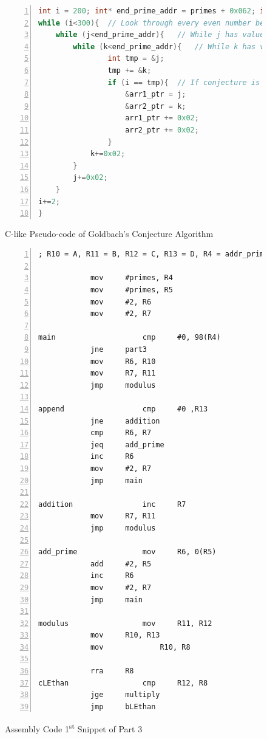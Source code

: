 \documentclass[pdftex,12pt,a4paper]{article}
\begin{document}
\begin{figure}[H]
    \centering
\begin{lstlisting}[language={C}, numbers=left]
int i = 200; int* end_prime_addr = primes + 0x062; int** arr1_ptr = array1; int** arr2_ptr = array2;
while (i<300){  // Look through every even number between
    while (j<end_prime_addr){   // While j has values to test
        while (k<end_prime_addr){   // While k has values to test
                int tmp = &j;
                tmp += &k;
                if (i == tmp){  // If conjecture is found store its memory addr in memory
                    &arr1_ptr = j;
                    &arr2_ptr = k;
                    arr1_ptr += 0x02;
                    arr2_ptr += 0x02;
                }
            k+=0x02;
        }
        j+=0x02;
    }
i+=2;
}
\end{lstlisting}
    \caption{C-like Pseudo-code of Goldbach's Conjecture Algorithm}
    \label{code:part3_C}
\end{figure}

\begin{figure}[H]
    \centering
\begin{lstlisting}[language={[x86masm]Assembler}, numbers=left]
; R10 = A, R11 = B, R12 = C, R13 = D, R4 = addr_primes, R5 = prime_index, R6 = prime_test, R7 = iteration, R8 = temp_modulus

			mov		#primes, R4
			mov		#primes, R5
			mov		#2, R6
			mov		#2, R7
    
main	             	cmp		#0, 98(R4)
			jne		part3
			mov		R6, R10
			mov		R7, R11
			jmp		modulus

append	             	cmp		#0 ,R13
			jne		addition
			cmp		R6, R7
			jeq		add_prime
			inc		R6
			mov		#2, R7
			jmp		main

addition                inc		R7
			mov		R7,	R11
			jmp		modulus

add_prime               mov		R6, 0(R5)
			add		#2, R5
			inc		R6
			mov		#2, R7
			jmp		main

modulus	    	        mov		R11, R12
			mov		R10, R13
			mov 	        R10, R8

			rra		R8
cLEthan	    	        cmp		R12, R8
			jge		multiply
			jmp		bLEthan    \end{lstlisting}
    \caption{Assembly Code 1\textsuperscript{st} Snippet of Part 3}
    \label{code:part3_1}
\end{figure}
\end{document}
